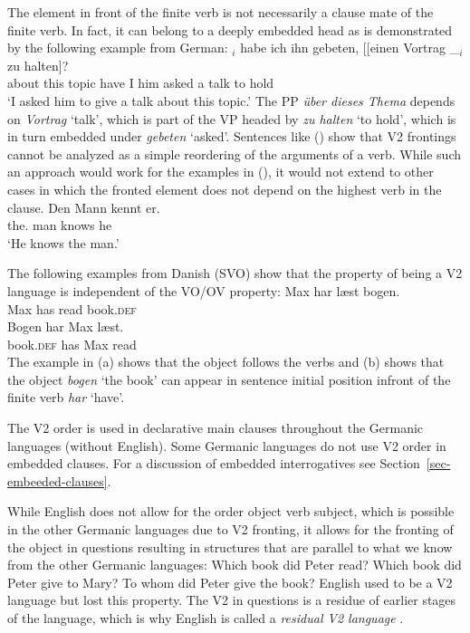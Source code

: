 The element in front of the finite verb is not necessarily a clause mate of the finite verb. In
fact, it can belong to a deeply embedded head as is demonstrated by the following example from
German:
\ea
{}$_i$ habe ich ihn gebeten, [[einen Vortrag \_$_i$ zu halten]?\footnotemark\\
     \spacebr{}about this topic  have I him asked \hspaceThis{[[}a talk {} to hold\\\german
{}
\glt `I asked him to give a talk about this topic.'
\z
The PP \emph{über dieses Thema} depends on \emph{Vortrag} `talk', which is part of the VP headed by
\emph{zu halten} `to hold', which is in turn embedded under \emph{gebeten} `asked'. Sentences like
() show that V2 frontings cannot be analyzed as a simple reordering of the arguments of a
verb. While such an approach would work for the examples in (), it would not extend to other
cases in which the fronted element does not depend on the highest verb in the clause.
\ea
\gll Den Mann kennt er.\\
     the.\acc{} man knows he\\
\glt `He knows the man.'
\z

The following examples from Danish (SVO) show that the property of being a V2
language is independent of the VO/OV property:
\eal
\ex 
\gll Max har læst bogen.\\
     Max has read book.\textsc{def}\\\danish
\ex
\gll Bogen har Max læst.\\
     book.\textsc{def} has Max read\\
\zl
The example in (a) shows that the object follows the verbs and (b) shows that the
object \emph{bogen} `the book' can appear in sentence initial position infront of the finite verb
\emph{har} `have'.

The V2 order is used in declarative main clauses throughout the Germanic languages (without
English). Some Germanic languages do not use V2 order in embedded clauses. For a discussion of
embedded interrogatives see Section~\ref{sec-embeeded-clauses}.

While English does not allow for the order object verb subject, which is possible in the other Germanic
languages due to V2 fronting, it allows for the fronting of the object in questions resulting in
structures that are parallel to what we know from the other Germanic languages:
\eal
\ex Which book did Peter read?
\ex Which book did Peter give to Mary?
\ex To whom did Peter give the book?
\zl
English used to be a V2 language but lost this property. The V2 in questions is a residue of earlier
stages of the language, which is why English is called a \emph{residual V2 language} \citep{Rizzi1990a-u}. 

